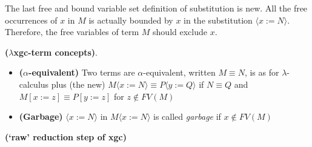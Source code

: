 The last free and bound variable set definition of substitution is new. All the free occurrences of $x$ in $M$ is actually bounded by $x$ in the substitution $\langle x:=N\rangle$. Therefore, the free variables of term $M$ should exclude $x$. 

\begin{def1}
\normalfont \textbf{($\lambda$xgc-term concepts)}. 
\end{def1}

\begin{itemize}
\item \textbf{($\alpha$-equivalent)} Two terms are $\alpha$-equivalent, written $M\equiv N$, is as for $\lambda$-calculus plus (the new) $M\langle x:=N\rangle \equiv P\langle y:=Q\rangle$ if $N \equiv Q$ and $M[x:=z]\equiv P[y:=z]$ for $z \notin FV(M)$
\item \textbf{(Garbage)} $\langle x:=N\rangle$ in $M\langle x:=N\rangle$ is called \textit{garbage} if $x \notin FV(M)$
\end{itemize}



\begin{def1}
\normalfont \textbf{(`raw' reduction step of xgc)}
\end{def1}

